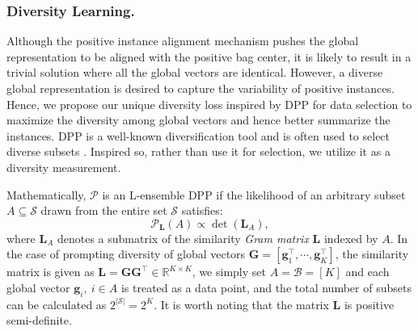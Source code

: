 \documentclass[runningheads]{llncs}
\begin{document}
\subsubsection{Diversity Learning.}
Although the positive instance alignment mechanism pushes the global representation to be aligned with the positive bag center, it is likely to result in a trivial solution where all the global vectors are identical. However, a diverse global representation is desired to capture the variability of positive instances. Hence, we propose our unique diversity loss inspired by DPP for data selection to maximize the diversity among global vectors and hence better summarize the instances. 
DPP is a well-known diversification tool \cite{kulesza2012determinantal} and is often used to select diverse subsets \cite{chen2018fast,tremblay2019determinantal,derezinski2021determinantal,chen2023rd,10580972}. Inspired so, rather than use it for selection, we utilize it as a diversity measurement.



Mathematically, $\mathcal{P}$ is an L-ensemble DPP if the likelihood of an arbitrary subset $A \subseteq \mathcal{S}$ drawn from the entire set $\mathcal{S}$ satisfies:
\begin{equation}
    \mathcal{P}_{\boldsymbol{L}}(A) \propto \operatorname{det}\left(\boldsymbol{L}_{A}\right),
\label{eqn:dpp}
\end{equation}
where $\boldsymbol{L}_{A}$ denotes a submatrix of the similarity \textit{Gram matrix} $\boldsymbol{L}$ indexed by $A$. In the case of prompting diversity of global vectors $\boldsymbol{G}=[\boldsymbol{g}_1^\top,\cdots,\boldsymbol{g}_K^\top ]$, the similarity matrix is given as $\boldsymbol{L} = \boldsymbol{G} \boldsymbol{G}^{\top} \in \mathbb{R}^{K \times K}$, we simply set $A=\mathcal{B}=[K]$ and each global vector $\boldsymbol{g}_i, ~i \in A$ is treated as a data point, and the total number of subsets can be calculated as $2^{|\mathcal{S}|} = 2^{K}$. It is worth noting that the matrix $\boldsymbol{L}$ is positive semi-definite. 
\end{document}
